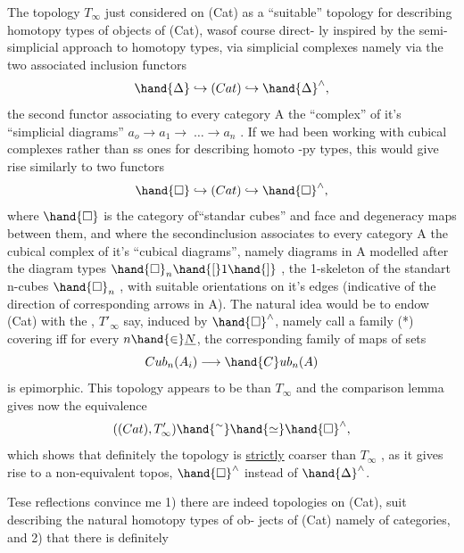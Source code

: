 The topology $T_\infty$  just considered on (Cat) as a ``suitable'' topology
for describing homotopy types of objects of (Cat),  was\hand{|}of course direct-%
ly inspired by the semi-simplicial approach to homotopy types,  via
simplicial complexes  namely via the two associated inclusion functors
\[ \hand{\Delta} \hookrightarrow (Cat)\hookrightarrow \hand{\Delta}^{\wedge} , \]
the second functor associating to every category A the ``complex'' of it's
``simplicial diagrams''  $a_o\longrightarrow a_1\longrightarrow \;\ldots\longrightarrow a_n$ .  If we had been working
 with  cubical complexes rather than ss ones for describing homoto
-py types,  this would give rise similarly to two functors
\[ \hand{\square} \hookrightarrow (Cat)\hookrightarrow \hand{\square}^{\wedge} , \]
where $\hand{\square}$ is the category of``standar cubes'' and face and degeneracy
maps between them,  and where the second\hand{|}inclusion associates to every
category A the cubical complex of it's  ``cubical diagrams'',  namely 
diagrams in A modelled after the diagram types $\hand{\square}_n\hand{[}1\hand{]}$ ,  the 1-skeleton
of the standart n-cubes $\hand{\square}_n$ , with suitable orientations on it's edges
(indicative of the direction of corresponding arrows in A).  The natural
idea  would be to endow (Cat) with the , $T'_\infty$ say,  induced
by $\hand{\square}^{\wedge}$,  namely call a family (*)  covering iff for every $n\hand{\in} \underline{N}$,  the
corresponding family  of  maps of sets
\[ Cub_n(A_i)\longrightarrow \hand{C}ub_n(A) \]
is epimorphic.   This  topology appears to be  than $T_\infty$ \xout{,}
and the comparison lemma gives now the equivalence
\[ ((Cat),T'_\infty)\hand{^{\sim}} \hand{\simeq} \hand{\square}^{\wedge} , \]
which shows that definitely the topology is \uline{strictly} coarser than $T_\infty$ ,
as it gives rise to a non-equivalent topos,  $\hand{\square}^{\wedge}$ instead of $\hand{\Delta}^{\wedge}$.

Tese reflections convince me  1)  there are indeed topologies
on (Cat),  suit describing the natural homotopy types of ob-%
jects of (Cat) namely of categories,  and  2)  that there is definitely
